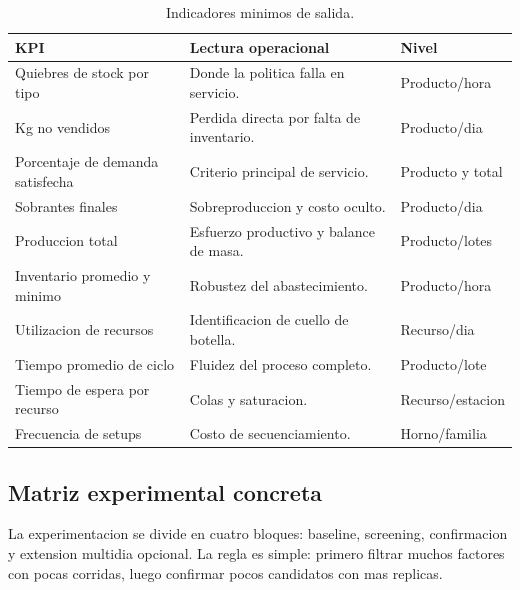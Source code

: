 \documentclass[12pt]{article}
\begin{document}
\begin{table}[H]
\centering
\caption{Indicadores minimos de salida.}
\begin{tabularx}{\textwidth}{L{4.0cm}Y L{3.3cm}}
\toprule
{}
\color{white}KPI & \color{white}Lectura operacional & \color{white}Nivel \\
\midrule
Quiebres de stock por tipo & Donde la politica falla en servicio. & Producto/hora \\
Kg no vendidos & Perdida directa por falta de inventario. & Producto/dia \\
Porcentaje de demanda satisfecha & Criterio principal de servicio. & Producto y total \\
Sobrantes finales & Sobreproduccion y costo oculto. & Producto/dia \\
Produccion total & Esfuerzo productivo y balance de masa. & Producto/lotes \\
Inventario promedio y minimo & Robustez del abastecimiento. & Producto/hora \\
Utilizacion de recursos & Identificacion de cuello de botella. & Recurso/dia \\
Tiempo promedio de ciclo & Fluidez del proceso completo. & Producto/lote \\
Tiempo de espera por recurso & Colas y saturacion. & Recurso/estacion \\
Frecuencia de setups & Costo de secuenciamiento. & Horno/familia \\
\bottomrule
\end{tabularx}
\end{table}

\subsection{Matriz experimental concreta}

La experimentacion se divide en cuatro bloques: baseline, screening, confirmacion y extension multidia opcional. La regla es simple: primero filtrar muchos factores con pocas corridas, luego confirmar pocos candidatos con mas replicas.
\end{document}
